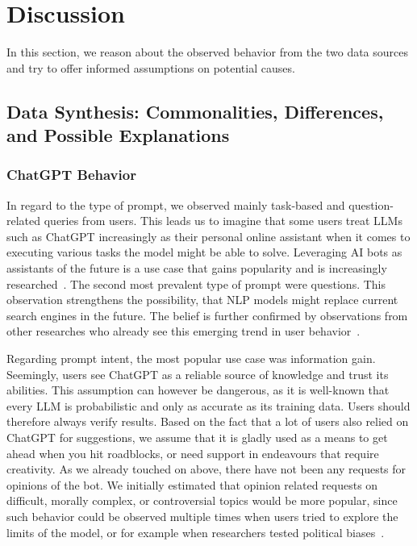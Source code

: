 \section{Discussion}
\label{sec:discussion}
In this section, we reason about the observed behavior from the two data sources and try to offer
informed assumptions on potential causes.


\subsection{Data Synthesis: Commonalities, Differences, and Possible Explanations}
\label{subsec:data-synthesis:-commonalities-differences-and-possible-explanations}

\subsubsection{ChatGPT Behavior}
In regard to the type of prompt, we observed mainly task-based and question-related queries from
users.
This leads us to imagine that some users treat LLMs such as ChatGPT increasingly as their
personal online assistant when it comes to executing various tasks the model might be able to solve.
Leveraging AI bots as assistants of the future is a use case that gains popularity and is
increasingly researched~\cite{eshghie_chatgpt_2023}.
The second most prevalent type of prompt were questions.
This observation strengthens the possibility, that NLP models might replace current search engines
in the future.
The belief is further confirmed by observations from other researches who already see this
emerging trend in user behavior~\cite{van_bulck_what_2023}.

Regarding prompt intent, the most popular use case was information gain.
Seemingly, users see ChatGPT as a reliable source of knowledge and trust its abilities.
This assumption can however be dangerous, as it is well-known that every LLM is probabilistic and
only as accurate as its training data.
Users should therefore always verify results.
Based on the fact that a lot of users also relied on ChatGPT for suggestions, we assume that it
is gladly used as a means to get ahead when you hit roadblocks, or need support in endeavours
that require creativity.
As we already touched on above, there have not been any requests for opinions of the bot.
We initially estimated that opinion related requests on difficult, morally complex, or
controversial topics would be more popular, since such behavior could be observed multiple times
when users tried to explore the limits of the model, or for example when researchers tested
political biases~\cite{rozado_political_2023}.

